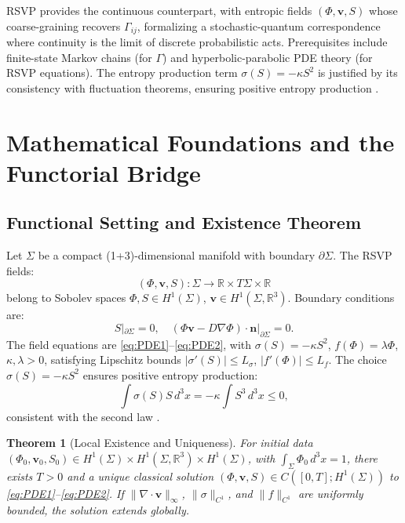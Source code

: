 \documentclass[12pt]{article}
\newtheorem{theorem}{Theorem}
\begin{document}
RSVP provides the continuous counterpart, with entropic fields \((\Phi, \mathbf{v}, S)\) whose coarse-graining recovers \(\Gamma_{ij}\), formalizing a stochastic-quantum correspondence where continuity is the limit of discrete probabilistic acts. Prerequisites include finite-state Markov chains (for \(\Gamma\)) and hyperbolic-parabolic PDE theory (for RSVP equations). The entropy production term \(\sigma(S) = -\kappa S^2\) is justified by its consistency with fluctuation theorems, ensuring positive entropy production \cite{Seifert2012}.

\section{Mathematical Foundations and the Functorial Bridge}

\subsection{Functional Setting and Existence Theorem}

Let \(\Sigma\) be a compact (1+3)-dimensional manifold with boundary \(\partial \Sigma\). The RSVP fields:
\[
(\Phi, \mathbf{v}, S): \Sigma \to \mathbb{R} \times T\Sigma \times \mathbb{R}
\]
belong to Sobolev spaces \(\Phi, S \in H^1(\Sigma)\), \(\mathbf{v} \in H^1(\Sigma, \mathbb{R}^3)\). Boundary conditions are:
\[
S|_{\partial \Sigma} = 0, \quad (\Phi \mathbf{v} - D \nabla \Phi) \cdot \mathbf{n}|_{\partial \Sigma} = 0.
\]
The field equations are \eqref{eq:PDE1}--\eqref{eq:PDE2}, with \(\sigma(S) = -\kappa S^2\), \(f(\Phi) = \lambda \Phi\), \(\kappa, \lambda > 0\), satisfying Lipschitz bounds \(|\sigma'(S)| \leq L_\sigma\), \(|f'(\Phi)| \leq L_f\). The choice \(\sigma(S) = -\kappa S^2\) ensures positive entropy production:
\[
\int \sigma(S) S \, d^3x = -\kappa \int S^3 \, d^3x \leq 0,
\]
consistent with the second law \cite{Seifert2012}.

\begin{theorem}[Local Existence and Uniqueness]
\label{thm:wellposed}
For initial data \((\Phi_0, \mathbf{v}_0, S_0) \in H^1(\Sigma) \times H^1(\Sigma, \mathbb{R}^3) \times H^1(\Sigma)\), with \(\int_\Sigma \Phi_0 \, d^3x = 1\), there exists \(T > 0\) and a unique classical solution \((\Phi, \mathbf{v}, S) \in C([0, T]; H^1(\Sigma))\) to \eqref{eq:PDE1}--\eqref{eq:PDE2}. If \(\|\nabla \cdot \mathbf{v}\|_\infty\), \(\|\sigma\|_{C^1}\), and \(\|f\|_{C^1}\) are uniformly bounded, the solution extends globally.
\end{theorem}
\end{document}
